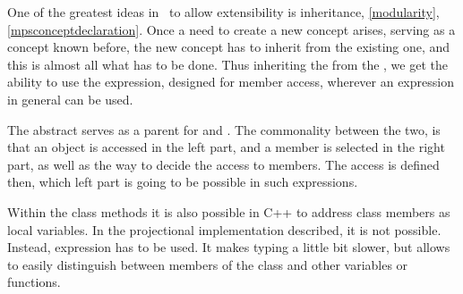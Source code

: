 One of the greatest ideas in \jbmps\ to allow extensibility is  inheritance, \ref{modularity}, \ref{mpsconceptdeclaration}. 
Once a need to create a new concept arises, serving as a concept known before, the new concept has to inherit from the existing one, 
and this is almost all what has to be done. Thus inheriting the   from the  
, we get the ability to use the expression, designed for member access, wherever an expression in general can be used. 

The abstract   serves as a parent for  and .
The commonality between the two, is
that an object is accessed in the left part, and a member is selected in the right part, as well as the way to decide the access to members.
The access is defined then, which left part is going to be possible in such expressions.


Within the class methods it is also possible in C++ to address class members as local variables. In the projectional implementation
described, it is not possible. Instead,  expression has to be used. It makes typing a little bit slower, but allows to
easily distinguish between members of the class and other variables or functions.
